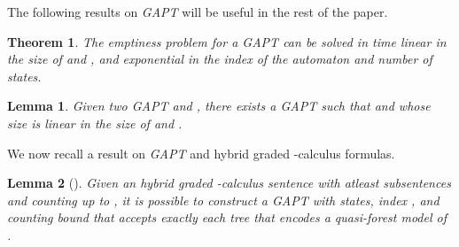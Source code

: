 \documentclass{LMCS}
\theoremstyle{plain}
\def \GAPT          {\emph{GAPT}\xspace}
\def \TGAPT         {\emph{GAPT}\xspace}
\newtheorem{theorem}{Theorem}
\newtheorem{lemma}{Lemma}
\begin{document}
The following results on \TGAPT will be useful in the rest of the
paper.

\begin{theorem}\cite{BLMV06}\label{the:TgaptEmptiness}
The emptiness problem for a \GAPT  can be solved in time linear in the size of  and
, and exponential in the index of the automaton and number of
states.
\end{theorem}

\begin{lemma}\cite{BLMV06}\label{lem:TgaptIntersection}
Given two \GAPT  and , there exists a \GAPT  such
that  and whose size is linear in
the size of  and .
\end{lemma}

We now recall a result on \GAPT and hybrid graded -calculus
formulas.

\begin{lemma}[\cite{BLMV06}]\label{lem:FromFormulasToAutomata}
Given an hybrid graded -calculus sentence  with 
\emph{atleast} subsentences and counting up to , it is possible to construct
a \GAPT with  states, index , and counting
bound  that accepts exactly each tree that encodes a quasi-forest model of
.
\end{lemma}
\end{document}
